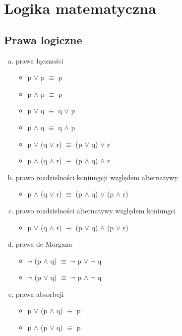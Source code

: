 \documentclass[10pt]{mwart}
\theoremstyle{plain} \newtheorem{tw}{Twierdzenie}[section]
\theoremstyle{plain} \newtheorem{lem}[tw]{Lemat}
\theoremstyle{definition} \newtheorem{df}[tw]{Definicja}
\begin{document}
\section{Logika matematyczna}
\subsection{Prawa logiczne}
\begin{enumerate}[a)]
   \item prawa łączności
   \begin{itemize}
       \item p \(\vee\) p \(\equiv\) p
        \item p \(\wedge\) p \(\equiv\) p
       \item p \(\vee\) q \(\equiv\) q \(\vee\) p
       \item p \(\wedge\) q \(\equiv\) q \(\wedge\) p
       \item p \(\vee\) (q \(\vee \) r) \(\equiv\) (p \(\vee \) q) \(\vee\) r
       \item p \(\wedge\) (q \(\wedge\) r) \(\equiv\) (p \(\wedge\) q) \(\wedge\) r
   \end{itemize}
   \item prawo rozdzielności koniungcji względem alternatywy\cite{odnośnik1}
   \begin{itemize}
       \item p \(\wedge\) (q \(\vee\) r) \(\equiv\) (p \(\wedge\) q) \(\vee\) (p \(\wedge\) r)
   \end{itemize}
   \item prawo rozdzielności alternatywy względem koniungci
     \begin{itemize}
       \item p \(\vee\) (q \(\wedge\) r) \(\equiv\) (p \(\vee\) q) \(\wedge\) (p \(\vee\) r)
   \end{itemize}
   \item prawa de Morgana
   \begin{itemize}
       \item \(\neg\) (p \(\wedge\) q) \(\equiv\) \(\neg\) p \(\vee\) \(\neg\) q
       \item \(\neg\) (p \(\vee\) q) \(\equiv\) \(\neg\) p \(\wedge\) \(\neg\) q
   \end{itemize}
   \item prawa absorbcji
   \begin{itemize}
       \item  p \(\vee\) (p \(\wedge\) q) \(\equiv\) p
       \item  p \(\wedge\) (p \(\vee\) q) \(\equiv\) p

\end{itemize}
\end{enumerate}
\end{document}

